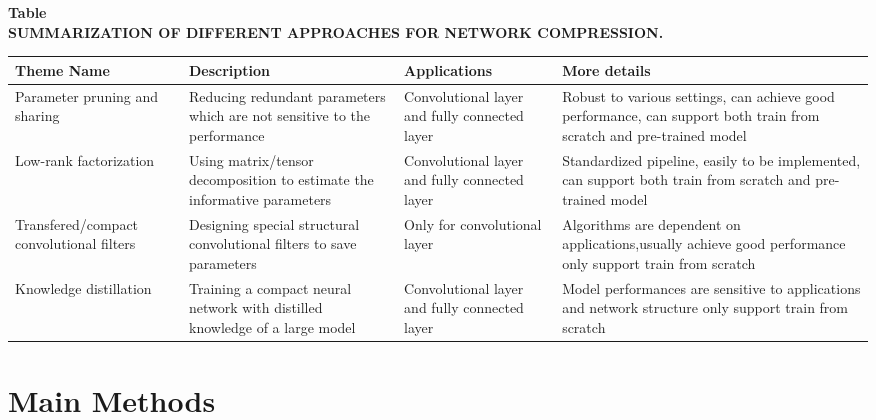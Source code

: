 \documentclass[a4paper]{article}
\begin{document}
	\begin{center}	
		\textbf{Table}~~\\{\bfseries SUMMARIZATION OF DIFFERENT APPROACHES FOR NETWORK COMPRESSION.}
			\begin{table}[h] \footnotesize
				\begin{tabular}{|p{3.5cm}|p{5cm}|p{4cm}|p{4cm}|}
					\hline
					Theme Name &Description &Applications &More details\\
					\hline
					Parameter pruning and sharing& Reducing redundant parameters which are not sensitive to the performance & Convolutional layer and fully connected layer& Robust to various settings, can achieve good performance, can support both train from scratch and pre-trained model\\
					\hline
					Low-rank factorization &Using matrix/tensor decomposition to estimate the informative parameters
					&Convolutional layer and fully connected layer &Standardized pipeline, easily to be implemented, can support both train from scratch and pre-trained model\\
					\hline
					Transfered/compact convolutional filters&Designing special structural convolutional filters to save parameters&Only for convolutional layer&Algorithms are dependent on applications,usually achieve good performance only support train from scratch\\
					\hline
					Knowledge distillation&Training a compact neural network with distilled knowledge of a large model &Convolutional layer and fully connected layer&Model performances are sensitive to applications and network structure only support train from scratch\\
					\hline
				\end{tabular}	
			\end{table}
	\end{center}

	\section{Main Methods}
\end{document}
